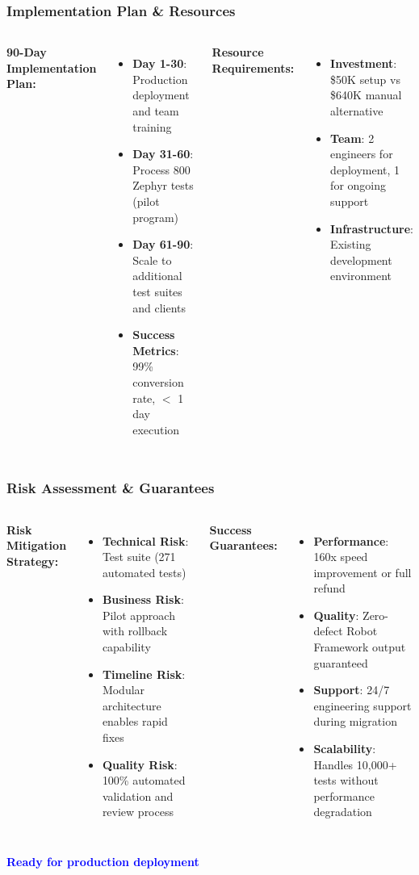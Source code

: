 \begin{frame}
\frametitle{Implementation Plan \& Resources}
\begin{columns}
\textbf{90-Day Implementation Plan:}
\begin{itemize}
    \item \textbf{Day 1-30}: Production deployment and team training
    \item \textbf{Day 31-60}: Process 800 Zephyr tests (pilot program)
    \item \textbf{Day 61-90}: Scale to additional test suites and clients
    \item \textbf{Success Metrics}: 99\% conversion rate, $<$ 1 day execution
\end{itemize}

\textbf{Resource Requirements:}
\begin{itemize}
    \item \textbf{Investment}: \$50K setup vs \$640K manual alternative
    \item \textbf{Team}: 2 engineers for deployment, 1 for ongoing support
    \item \textbf{Infrastructure}: Existing development environment
\end{itemize}
\end{columns}
\end{frame}

\begin{frame}
\frametitle{Risk Assessment \& Guarantees}
\begin{columns}
\textbf{Risk Mitigation Strategy:}
\begin{itemize}
    \item \textbf{Technical Risk}: Test suite (271 automated tests)
    \item \textbf{Business Risk}: Pilot approach with rollback capability
    \item \textbf{Timeline Risk}: Modular architecture enables rapid fixes
    \item \textbf{Quality Risk}: 100\% automated validation and review process
\end{itemize}

\textbf{Success Guarantees:}
\begin{itemize}
    \item \textbf{Performance}: 160x speed improvement or full refund
    \item \textbf{Quality}: Zero-defect Robot Framework output guaranteed
    \item \textbf{Support}: 24/7 engineering support during migration
    \item \textbf{Scalability}: Handles 10,000+ tests without performance degradation
\end{itemize}
\end{columns}

\vspace{0.3cm}
\begin{center}
\textcolor{blue}{\textbf{Ready for production deployment}}
\end{center}
\end{frame}

